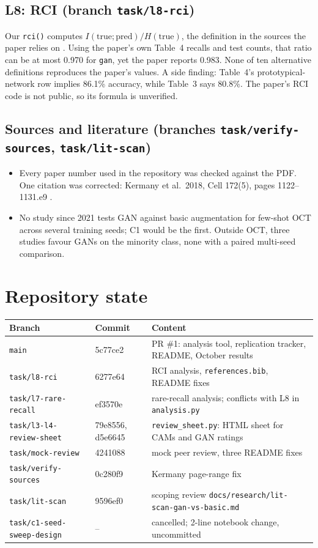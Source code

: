 \documentclass[10pt,a4paper]{article}
\newcommand{\file}[1]{\texttt{\small #1}}
\begin{document}
\subsection{L8: RCI (branch \texttt{task/l8-rci})}
Our \texttt{rci()} computes $I(\text{true};\text{pred}) / H(\text{true})$, the definition
in the sources the paper relies on \cite{statnikov2005,sindhwani2001}. Using the paper's own
Table~4 recalls and test counts, that ratio can be at most 0.970 for \texttt{gan}, yet the
paper reports 0.983. None of ten alternative definitions reproduces the paper's values.
A side finding: Table~4's prototypical-network row implies 86.1\% accuracy, while Table~3
says 80.8\%. The paper's RCI code is not public, so its formula is unverified.

\subsection{Sources and literature (branches \texttt{task/verify-sources}, \texttt{task/lit-scan})}
\begin{itemize}
  \item Every paper number used in the repository was checked against the PDF. One
        citation was corrected: Kermany et al.\ 2018, Cell 172(5), pages 1122--1131.e9
        \cite{kermany2018}.
  \item No study since 2021 tests GAN against basic augmentation for few-shot OCT across
        several training seeds; C1 would be the first. Outside OCT, three studies favour GANs
        on the minority class, none with a paired multi-seed comparison.
\end{itemize}

\section{Repository state}

\noindent
\begin{tabularx}{\linewidth}{@{}l l Y@{}}
\toprule
Branch & Commit & Content \\
\midrule
\file{main} & 5c77ce2 & PR \#1: analysis tool, replication tracker, README, October results \\
\file{task/l8-rci} & 6277e64 & RCI analysis, \file{references.bib}, README fixes \\
\file{task/l7-rare-recall} & ef3570e & rare-recall analysis; conflicts with L8 in \file{analysis.py} \\
\file{task/l3-l4-review-sheet} & 79e8556, d5e6645 & \file{review\_sheet.py}: HTML sheet for CAMs and GAN ratings \\
\file{task/mock-review} & 4241088 & mock peer review, three README fixes \\
\file{task/verify-sources} & 0c280f9 & Kermany page-range fix \\
\file{task/lit-scan} & 9596ef0 & scoping review \file{docs/research/lit-scan-gan-vs-basic.md} \\
\file{task/c1-seed-sweep-design} & -- & cancelled; 2-line notebook change, uncommitted \\
\bottomrule
\end{tabularx}
\end{document}
